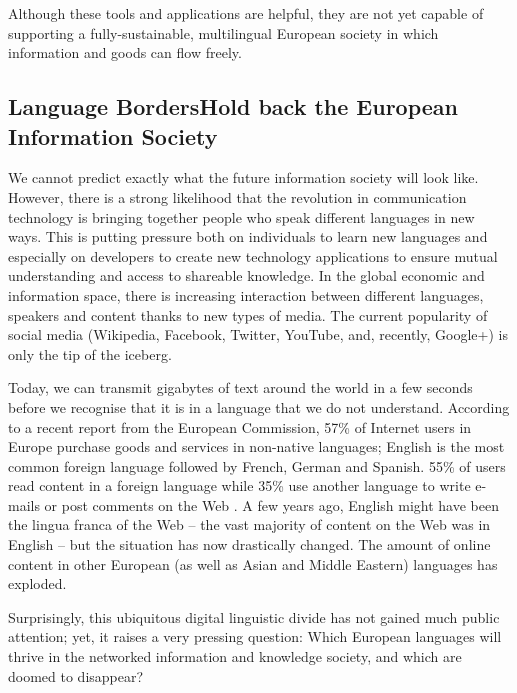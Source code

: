 \begin{multicols}{2}
Although these tools and applications are helpful, they are not yet capable of supporting a fully-sustainable, multilingual European society in which information and goods can flow freely.

\subsection[Language Borders Hold back the European Information Society]{Language Borders\newline Hold back the European Information Society}

We cannot predict exactly what the future information society will look like. However, there is a strong likelihood that the revolution in communication technology is bringing together people who speak different languages in new ways. This is putting pressure both on individuals to learn new languages and especially on developers to create new technology applications to ensure mutual understanding and access to shareable knowledge. In the global economic and information space, there is increasing interaction between different languages, speakers and content thanks to new types of media. The current popularity of social media (Wikipedia, Facebook, Twitter, YouTube, and, recently, Google+) is only the tip of the iceberg.


Today, we can transmit gigabytes of text around the world in a few seconds before we recognise that it is in a language that we do not understand. According to a recent report from the European Commission, 57\% of Internet users in Europe purchase goods and services in non-native languages; English is the most common foreign language followed by French, German and Spanish. 55\% of users read content in a foreign language while 35\% use another language to write e-mails or post comments on the Web \cite{EC1}. A few years ago, English might have been the lingua franca of the Web -- the vast majority of content on the Web was in English -- but the situation has now drastically changed. The amount of online content in other European (as well as Asian and Middle Eastern) languages has exploded.

Surprisingly, this ubiquitous digital linguistic divide has not gained much public attention; yet, it raises a very pressing question: Which European languages will thrive in the networked information and knowledge society, and which are doomed to disappear?


\end{multicols}
